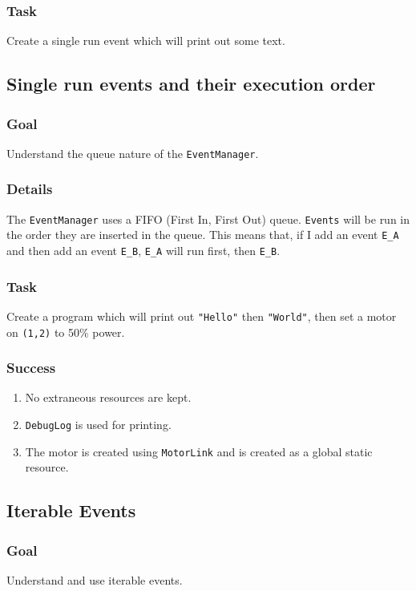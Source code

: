 \documentclass[a4paper]{article}
\begin{document}
\subsubsection{Task} Create a single run event which will print out some text.

\pagebreak\subsection{Single run events and their execution order}
\subsubsection{Goal} Understand the queue nature of the \lstinline{EventManager}.
\subsubsection{Details} The \lstinline{EventManager} uses a FIFO (First In, First Out) queue. \lstinline{Events} will be run in the order they are inserted in the queue. This means that, if I add an event \lstinline{E_A} and then add an event \lstinline{E_B}, \lstinline{E_A} will run first, then \lstinline{E_B}.
\subsubsection{Task} Create a program which will print out \lstinline{"Hello"} then \lstinline{"World"}, then set a motor on \lstinline{(1,2)} to 50\% power.
\subsubsection{Success} \begin{enumerate}\item{No extraneous resources are kept.}\item{\lstinline{DebugLog} is used for printing.}\item{The motor is created using \lstinline{MotorLink} and is created as a global static resource.}\end{enumerate}

\pagebreak\subsection{Iterable Events}
\subsubsection{Goal} Understand and use iterable events.
\end{document}
